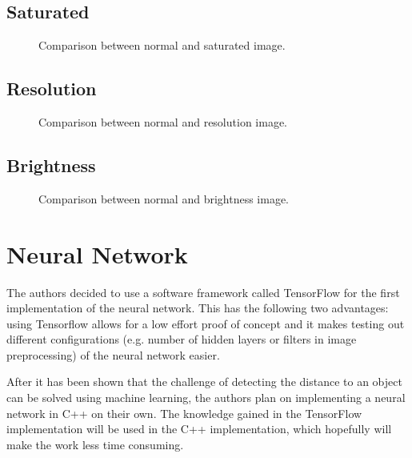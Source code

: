 \subsection{Saturated}

\begin{figure}[h!]
	\centering
	\caption{Comparison between normal and saturated image.}
	\label{pic:implementation_opencv_saturated}
\end{figure}

\subsection{Resolution}

\begin{figure}[h!]
	\centering
	\caption{Comparison between normal and resolution image.}
	\label{pic:implementation_opencv_resolution}
\end{figure}

\subsection{Brightness}

\begin{figure}[h!]
	\centering
	\caption{Comparison between normal and brightness image.}
	\label{pic:implementation_opencv_brightness}
\end{figure}

\section{Neural Network}
The authors decided to use a software framework called TensorFlow for the first implementation of the neural network. This has the following two advantages: using Tensorflow allows for a low effort proof of concept and it makes testing out different configurations (e.g. number of hidden layers or filters in image preprocessing) of the neural network easier.

After it has been shown that the challenge of detecting the distance to an object can be solved using machine learning, the authors plan on implementing a neural network in C++ on their own. The knowledge gained in the TensorFlow implementation will be used in the C++ implementation, which hopefully will make the work less time consuming.

